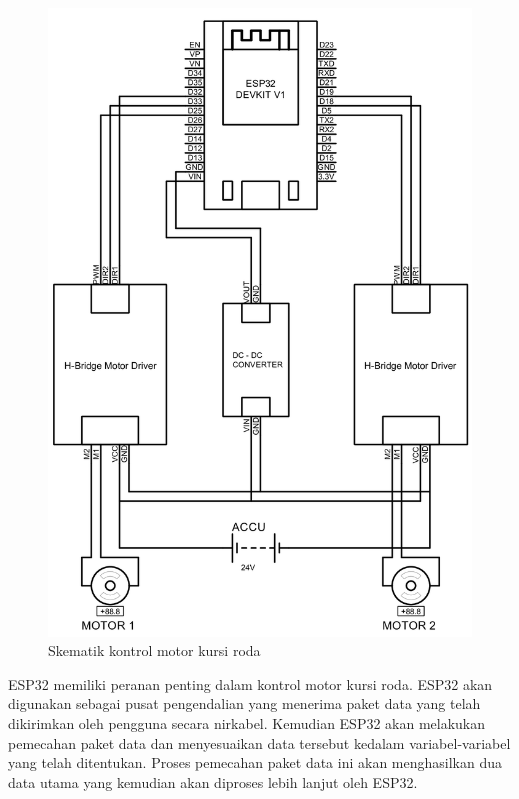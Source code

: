\begin{figure} [ht] \centering
  \includegraphics[scale=0.3]{gambar/bab3/Schematics.png}
  \caption{Skematik kontrol motor kursi roda}
  \label{fig:Skematik Alat}
\end{figure}

ESP32 memiliki peranan penting dalam kontrol motor kursi roda. ESP32 akan digunakan sebagai pusat pengendalian yang menerima paket data yang telah dikirimkan oleh pengguna secara nirkabel. Kemudian ESP32 akan melakukan pemecahan paket data dan menyesuaikan data tersebut kedalam variabel-variabel yang telah ditentukan. Proses pemecahan paket data ini akan menghasilkan dua data utama yang kemudian akan diproses lebih lanjut oleh ESP32.

